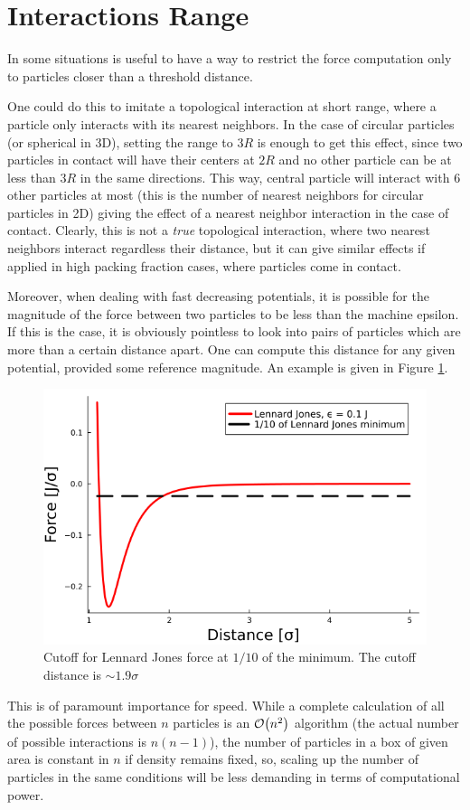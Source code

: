 \documentclass[../../master_thesis_np.tex]{subfiles}
\begin{document}
	\section{Interactions Range} \label{intrange}
	In some situations is useful to have a way to restrict the force computation only to particles closer than a threshold distance.
	
	One could do this to imitate a topological interaction at short range, where a particle only interacts with its nearest neighbors. In the case of circular particles (or spherical in 3D), setting the range to $3R$ is enough to get this effect, since two particles in contact will have their centers at $2R$ and no other particle can be at less than $3R$ in the same directions. This way, central particle will interact with 6 other particles at most (this is the number of nearest neighbors for circular particles in 2D) giving the effect of a nearest neighbor interaction in the case of contact. Clearly, this is not a \emph{true} topological interaction, where two nearest neighbors interact regardless their distance, but it can give similar effects if applied in high packing fraction cases, where particles come in contact.
	
	Moreover, when dealing with fast decreasing potentials, it is possible for the magnitude of the force between two particles to be less than the machine epsilon. If this is the case, it is obviously pointless to look into pairs of particles which are more than a certain distance apart. One can compute this distance for any given potential, provided some reference magnitude. An example is given in Figure \ref{fig:force_zero}.
	\begin{figure}[htp]
		\centering
		\includegraphics[width=\textwidth]{lj_zero.png}
		\caption{Cutoff for Lennard Jones force at $1/10$ of the minimum. The cutoff distance is $\sim 1.9\sigma$}
		\label{fig:force_zero}
	\end{figure}
	This is of paramount importance for speed. While a complete calculation of all the possible forces between $n$ particles is an $\order{n^2}$ algorithm (the actual number of possible interactions is $n(n-1)$), the number of particles in a box of given area is constant in $n$ if density remains fixed, so, scaling up the number of particles in the same conditions will be less demanding in terms of computational power.
	
\end{document}
